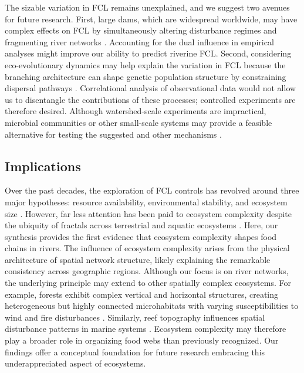\documentclass[9pt,twocolumn,twoside]{pnas-new}
\begin{document}
The sizable variation in FCL remains unexplained, and we suggest two avenues for future research. 
First, large dams, which are widespread worldwide, may have complex effects on FCL by simultaneously altering disturbance regimes and fragmenting river networks \citep{tamario_barriers_2025, ishiyama_predicting_2018}. 
Accounting for the dual influence in empirical analyses might improve our ability to predict riverine FCL. 
Second, considering eco-evolutionary dynamics may help explain the variation in FCL \citep{calcagno_coevolution_2023} because the branching architecture can shape genetic population structure by constraining dispersal pathways \citep{morrissey_maintenance_2009}.
Correlational analysis of observational data would not allow us to disentangle the contributions of these processes; controlled experiments are therefore desired. 
Although watershed-scale experiments are impractical, microbial communities or other small-scale systems may provide a feasible alternative for testing the suggested and other mechanisms \citep{altermatt_big_2015, green_long_2023}.

\subsection{Implications}

Over the past decades, the exploration of FCL controls has revolved around three major hypotheses: resource availability, environmental stability, and ecosystem size \citep{oksanen_exploitation_1981, pimm_number_1977, schoener_food_1989}.
However, far less attention has been paid to ecosystem complexity despite the ubiquity of fractals across terrestrial \citep{turner_landscape_2015} and aquatic ecosystems \citep{rodriguez-iturbe_fractal_2001}.
Here, our synthesis provides the first evidence that ecosystem complexity shapes food chains in rivers.
The influence of ecosystem complexity arises from the physical architecture of spatial network structure, likely explaining the remarkable consistency across geographic regions.
Although our focus is on river networks, the underlying principle may extend to other spatially complex ecosystems.
For example, forests exhibit complex vertical and horizontal structures, creating heterogeneous but highly connected microhabitats with varying susceptibilities to wind and fire disturbances \citep{peterson_contagious_2002, cansler_climate_2014}.
Similarly, reef topography influences spatial disturbance patterns in marine systems \citep{connell_30year_1997}.
Ecosystem complexity may therefore play a broader role in organizing food webs than previously recognized.
Our findings offer a conceptual foundation for future research embracing this underappreciated aspect of ecosystems.
\end{document}
